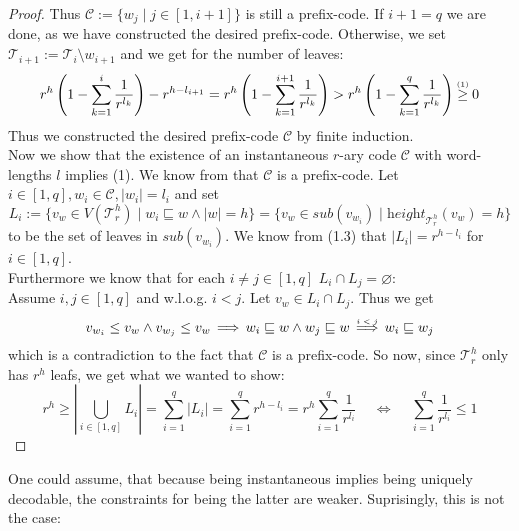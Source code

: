 \documentclass[12pt]{article}
\newcommand{\up}[2]{\mathrel{\overset{\makebox[0pt]{\mbox{\normalfont\tiny #2}}}{#1}}}
\newcommand{\T}[0]{{\mathcal{T}_r^h}}
\newcommand{\he}[0]{\textit{height}}
\newcommand{\SUB}[0]{\textit{sub}}
\newenvironment{statement3}[3]{\begin{trivlist}
\item[\hskip \labelsep {\bfseries #1}\hskip \labelsep {\bfseries #2} {#3}\textbf{.}]}{\end{trivlist}}
\begin{document}
\begin{statement3}{(1.7)}{Theorem}{(Kraft's Inequality)}
\begin{proof}
        Thus $\mathcal{C} := \{w_j \mid j \in [1, i+1]\}$ is still a prefix-code.
        If $i+1 = q$ we are done, as we have constructed the desired prefix-code. Otherwise,
        we set $\mathcal{T}_{i+1} := \mathcal{T}_i \setminus w_{i+1}$ and we get for the number of leaves:
        $$
            r^h\left(1-\sum_{k=1}^{i} \frac{1}{r^{l_k}}\right) - r^{h - l_{i+1}}
            = r^h\left(1-\sum_{k=1}^{i+1} \frac{1}{r^{l_k}}\right)
            > r^h\left(1-\sum_{k=1}^{q} \frac{1}{r^{l_k}}\right)
            \up{\geq}{(1)} 0
        $$
        Thus we constructed the desired prefix-code $\mathcal{C}$ by finite induction.\\[10pt]
        Now we show that the existence of an instantaneous $r$-ary code $\mathcal{C}$ with word-lengths $l$ implies (1).
        We know from \cite{ICT} that $\mathcal{C}$ is a prefix-code. Let $i \in [1,q],
        w_i \in \mathcal{C}, |w_i| = l_i$ and set
        $$
            L_i := \{v_w \in V(\T) \mid w_i \sqsubseteq w \land |w| = h\}
            = \{v_w \in \SUB(v_{w_i}) \mid \he_\T(v_w) = h\}
        $$
        to be the set of leaves in $\SUB(v_{w_i})$. We know from (1.3) that $|L_i| = r^{h - l_i}$
        for $i \in [1,q]$.\\
        Furthermore we know that for each $i\neq j \in [1,q]$ $L_i \cap L_j = \varnothing$:\\
        Assume $i,j \in [1,q]$ and w.l.o.g. $i < j$. Let $v_w \in L_i \cap L_j$. Thus we get
        $$
            v_{w_i} \leq v_w \land v_{w_j} \leq v_w \,\Longrightarrow\, w_i \sqsubseteq w \land w_j \sqsubseteq w
            \up{\,\Longrightarrow\,}{$i < j$} w_i \sqsubseteq w_j
        $$
        which is a contradiction to the fact that $\mathcal{C}$ is a prefix-code.
        So now, since $\T$ only has $r^h$ leafs, we get what we wanted to show:
        $$
            r^h \geq |\bigcup_{i \in [1,q]} L_i| = \sum_{i = 1}^{q} |L_i| = \sum_{i=1}^{q} r^{h-l_i}
            = r^h\sum_{i=1}^{q} \frac{1}{r^{l_i}}
            \quad\,\Longleftrightarrow\,\quad \sum_{i=1}^{q} \frac{1}{r^{l_i}} \leq 1
        $$
    \end{proof}
\end{statement3}

One could assume, that because being instantaneous implies being uniquely decodable, the constraints
for being the latter are weaker. Suprisingly, this is not the case:
\end{document}
